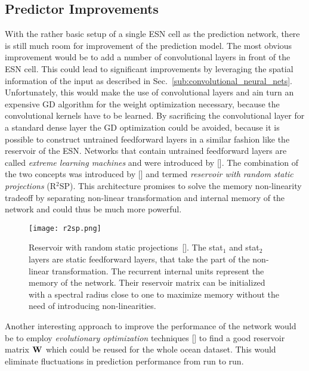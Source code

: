 \subsection{Predictor Improvements}
With the rather basic setup of a single ESN cell as the prediction network,
there is still much room for improvement of the prediction model.  The most
obvious improvement would be to add a number of  convolutional layers in front
of the ESN cell. This could lead to significant improvements by leveraging the
spatial information of the input as described in
Sec.~\ref{sub:convolutional_neural_nets}.  Unfortunately, this would make the
use of convolutional layers and ain turn an expensive GD algorithm for the
weight optimization necessary, because the convolutional kernels have to be
learned.  By sacrificing the convolutional layer for a standard dense layer the
GD optimization could be avoided, because it is possible to construct untrained
feedforward layers in a similar fashion like the reservoir of the ESN.
Networks that contain untrained feedforward layers are called \emph{extreme
learning machines} and were introduced by [\cite{huang2006}].  The combination
of the two concepts was introduced by [\cite{butcher2013}] and termed
\emph{reservoir with random static projections} (R$^2$SP).  This architecture
promises to solve the memory non-linearity tradeoff by separating non-linear
transformation and internal memory of the network and could thus be much more
powerful.

\begin{figure}
  \centering
  \texttt{[image: r2sp.png]}
  \caption{Reservoir with random static projections~[\cite{butcher2013}]. The
  stat$_1$ and stat$_2$ layers are static feedforward layers, that take the
  part of the non-linear transformation.  The recurrent internal units
  represent the memory of the network. Their reservoir matrix can be
  initialized with a spectral radius close to one to maximize memory without
  the need of introducing non-linearities.}
  \label{fig:r2sp}
\end{figure}

Another interesting approach to improve the performance of the network would be
to employ \emph{evolutionary optimization} techniques [\cite{fogel1997}] to find
a good reservoir matrix $\boldsymbol{\textbf{W}}^{\text{}}$ which could be reused for the whole ocean
dataset.  This would eliminate fluctuations in prediction performance from run
to run.


